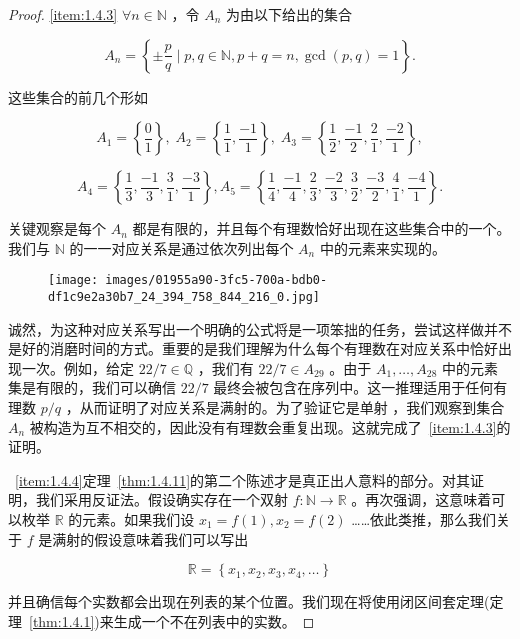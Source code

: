 \begin{proof}
\ref{item:1.4.3} \(\forall n \in  \mathbb{N}\) ，令 \({A}_{n}\) 为由以下给出的集合

\[
  {A}_{n} = \left\{  \pm \frac{p}{q} \mid p,q\in \mathbb{N}, p+q = n, \gcd(p,q) = 1\right\}  .
\]

这些集合的前几个形如

\[
{A}_{1} = \left\{  \frac{0}{1}\right\}  ,\;{A}_{2} = \left\{  {\frac{1}{1},\frac{-1}{1}}\right\}  ,\;{A}_{3} = \left\{  {\frac{1}{2},\frac{-1}{2},\frac{2}{1},\frac{-2}{1}}\right\}  ,
\]

\[
{A}_{4} = \left\{  {\frac{1}{3},\frac{-1}{3},\frac{3}{1},\frac{-3}{1}}\right\}  ,{A}_{5} = \left\{  {\frac{1}{4},\frac{-1}{4},\frac{2}{3},\frac{-2}{3},\frac{3}{2},\frac{-3}{2},\frac{4}{1},\frac{-4}{1}}\right\}  .
\]

关键观察是每个 \({A}_{n}\) 都是有限的，并且每个有理数恰好出现在这些集合中的一个。我们与 \(\mathbb{N}\) 的一一对应关系是通过依次列出每个 \({A}_{n}\) 中的元素来实现的。

\begin{figure}[h]
  \centering
  \texttt{[image: images/01955a90-3fc5-700a-bdb0-df1c9e2a30b7\_24\_394\_758\_844\_216\_0.jpg]}
\end{figure}


诚然，为这种对应关系写出一个明确的公式将是一项笨拙的任务，尝试这样做并不是好的消磨时间的方式。重要的是我们理解为什么每个有理数在对应关系中恰好出现一次。例如，给定 \({22}/7\in \mathbb{Q}\) ，我们有 \({22}/7 \in  {A}_{29}\) 。由于 \({A}_{1},\ldots ,{A}_{28}\) 中的元素集是有限的，我们可以确信 \({22}/7\) 最终会被包含在序列中。这一推理适用于任何有理数 \(p/q\) ，从而证明了对应关系是满射的。为了验证它是单射 ，我们观察到集合 \({A}_{n}\) 被构造为互不相交的，因此没有有理数会重复出现。这就完成了~\ref{item:1.4.3}的证明。

~\ref{item:1.4.4}定理~\ref{thm:1.4.11}的第二个陈述才是真正出人意料的部分。对其证明，我们采用反证法。假设确实存在一个双射 \(f : \mathbb{N} \rightarrow  \mathbb{R}\) 。再次强调，这意味着可以枚举 \(\mathbb{R}\) 的元素。如果我们设 \({x}_1 = f\left( 1\right) ,{x}_2 = f\left( 2\right)\) ……依此类推，那么我们关于 \(f\) 是满射的假设意味着我们可以写出

\begin{equation}
\label{eq:1.8}
\mathbb{R} = \left\{  {{x}_{1},{x}_{2},{x}_{3},{x}_{4},\ldots }\right\}
\end{equation}

并且确信每个实数都会出现在列表的某个位置。我们现在将使用闭区间套定理(定理~\ref{thm:1.4.1})来生成一个不在列表中的实数。


\end{proof}

